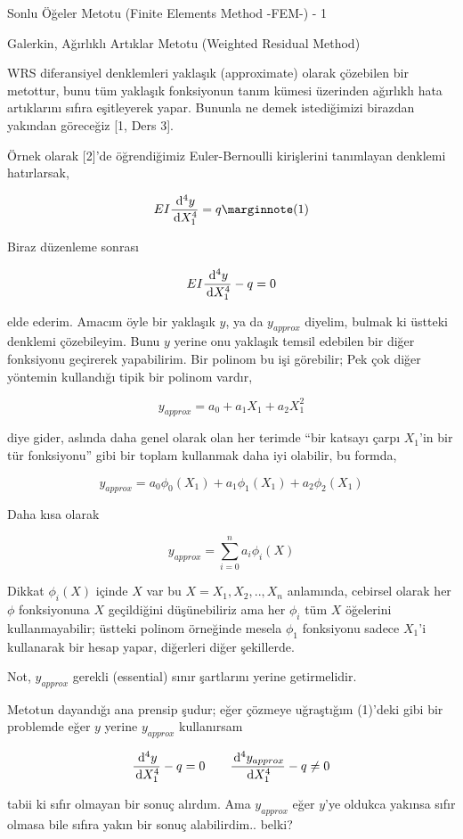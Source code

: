 \documentclass[12pt,fleqn]{article}\usepackage{../../common}
\begin{document}
Sonlu Öğeler Metotu (Finite Elements Method -FEM-) - 1

Galerkin, Ağırlıklı Artıklar Metotu (Weighted Residual Method)

WRS diferansiyel denklemleri yaklaşık (approximate) olarak çözebilen bir
metottur, bunu tüm yaklaşık fonksiyonun tanım kümesi üzerinden ağırlıklı hata
artıklarını sıfıra eşitleyerek yapar. Bununla ne demek istediğimizi birazdan
yakından göreceğiz [1, Ders 3].

Örnek olarak [2]'de öğrendiğimiz Euler-Bernoulli kirişlerini tanımlayan denklemi
hatırlarsak,

$$
E I \frac{\ud^4 y}{\ud X_1^4} = q
\mlabel{1}
$$

Biraz düzenleme sonrası

$$
E I \frac{\,\mathrm{d}^4 y}{\,\mathrm{d} X_1^4} - q = 0
$$

elde ederim. Amacım öyle bir yaklaşık $y$, ya da $y_{approx}$ diyelim, bulmak ki
üstteki denklemi çözebileyim. Bunu $y$ yerine onu yaklaşık temsil edebilen bir
diğer fonksiyonu geçirerek yapabilirim. Bir polinom bu işi görebilir; Pek çok
diğer yöntemin kullandığı tipik bir polinom vardır,

$$
y_{approx} = a_0 + a_1 X_1 + a_2 X_1^2 
$$

diye gider, aslında daha genel olarak olan her terimde ``bir katsayı çarpı
$X_1$'in bir tür fonksiyonu'' gibi bir toplam kullanmak daha iyi olabilir,
bu formda,

$$
y_{approx} = a_0 \phi_0(X_1) + a_1 \phi_1(X_1) + a_2 \phi_2(X_1) 
$$

Daha kısa olarak

$$
y_{approx} = \sum_{i=0}^{n} a_i \phi_i(X) 
$$

Dikkat $\phi_i(X)$ içinde $X$ var bu $X = X_1,X_2,..,X_n$ anlamında, cebirsel
olarak her $\phi$ fonksiyonuna $X$ geçildiğini düşünebiliriz ama her $\phi_i$
tüm $X$ öğelerini kullanmayabilir; üstteki polinom örneğinde mesela $\phi_1$
fonksiyonu sadece $X_1$'i kullanarak bir hesap yapar, diğerleri diğer şekillerde.

Not, $y_{approx}$ gerekli (essential) sınır şartlarını yerine getirmelidir.

Metotun dayandığı ana prensip şudur; eğer çözmeye uğraştığım (1)'deki gibi bir
problemde eğer $y$ yerine $y_{approx}$ kullanırsam

$$
\frac{\,\mathrm{d}^4 y}{\,\mathrm{d} X_1^4} - q = 0 \qquad
\frac{\,\mathrm{d}^4 y_{approx}}{\,\mathrm{d} X_1^4} - q \ne 0
$$

tabii ki sıfır olmayan bir sonuç alırdım. Ama $y_{approx}$ eğer $y$'ye oldukca
yakınsa sıfır olmasa bile sıfıra yakın bir sonuç alabilirdim.. belki?
\end{document}
